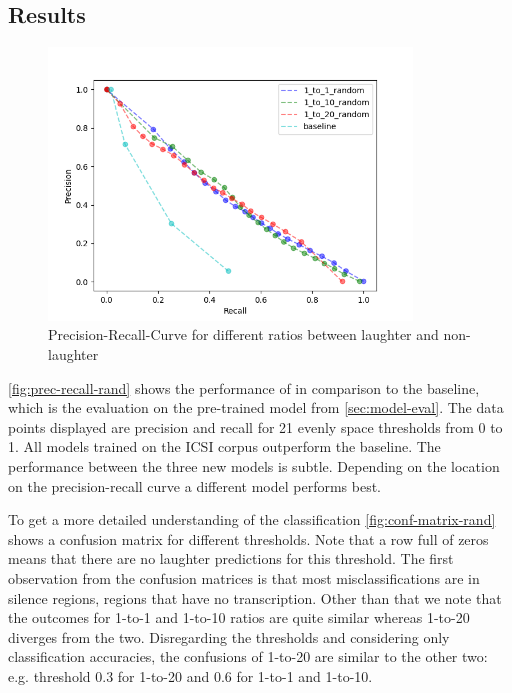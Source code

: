 \documentclass[bsc,frontabs,parskip,deptreport]{infthesis}
\begin{document}
\subsection{Results} \label{sec:exp1-res}

\begin{figure}[h!]
    \centering
    \includegraphics[width = 3.8in]{imgs/prec-recall/random/dev_compare_class_balance_dev_set.png}
    \caption{Precision-Recall-Curve for different ratios between laughter and non-laughter}
    \label{fig:prec-recall-rand}
\end{figure}

\autoref{fig:prec-recall-rand} shows the performance of in comparison to the baseline, which is the evaluation on the pre-trained model from \autoref{sec:model-eval}. The data points displayed are precision and recall for 21 evenly space thresholds from 0 to 1. All models trained on the ICSI corpus outperform the baseline. The performance between the three new models is subtle. Depending on the location on the precision-recall curve a different model performs best.

To get a more detailed understanding of the classification \autoref{fig:conf-matrix-rand} shows a confusion matrix for different thresholds. 
Note that a row full of zeros means that there are no laughter predictions for this threshold.
The first observation from the confusion matrices is that most misclassifications are in silence regions, regions that have no transcription. Other than that we note that the outcomes for 1-to-1 and 1-to-10 ratios are quite similar whereas 1-to-20 diverges from the two. Disregarding the thresholds and considering only classification accuracies, the confusions of 1-to-20 are similar to the other two: e.g. threshold 0.3 for 1-to-20 and 0.6 for 1-to-1 and 1-to-10.
\end{document}
